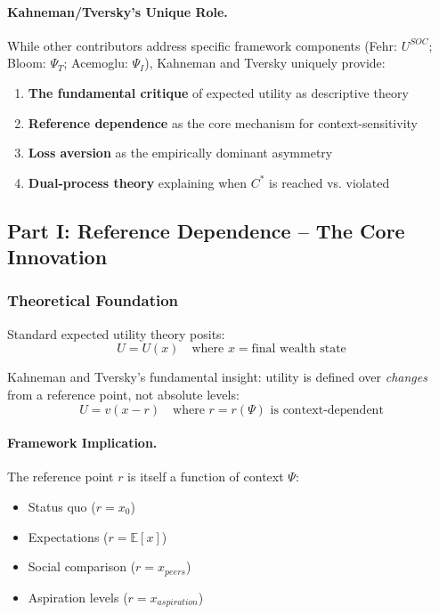 \paragraph{Kahneman/Tversky's Unique Role.}
While other contributors address specific framework components (Fehr: $U^{SOC}$; 
Bloom: $\Psi_T$; Acemoglu: $\Psi_I$), Kahneman and Tversky uniquely provide:
\begin{enumerate}
    \item \textbf{The fundamental critique} of expected utility as descriptive theory
    \item \textbf{Reference dependence} as the core mechanism for context-sensitivity
    \item \textbf{Loss aversion} as the empirically dominant asymmetry
    \item \textbf{Dual-process theory} explaining when $C^*$ is reached vs. violated
\end{enumerate}

\subsection{Part I: Reference Dependence – The Core Innovation}

\subsubsection{Theoretical Foundation}

Standard expected utility theory posits:
\begin{equation}
U = U(x) \quad \text{where } x = \text{final wealth state}
\end{equation}

Kahneman and Tversky's fundamental insight: utility is defined over \textit{changes} 
from a reference point, not absolute levels:
\begin{equation}
\boxed{
U = v(x - r) \quad \text{where } r = r(\Psi) \text{ is context-dependent}
}
\label{eq:kt-reference}
\end{equation}

\paragraph{Framework Implication.}
The reference point $r$ is itself a function of context $\Psi$:
\begin{itemize}
    \item Status quo ($r = x_0$)
    \item Expectations ($r = \mathbb{E}[x]$)
    \item Social comparison ($r = x_{peers}$)
    \item Aspiration levels ($r = x_{aspiration}$)
\end{itemize}

